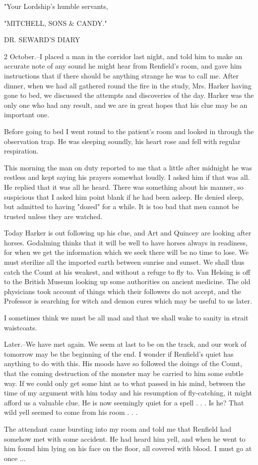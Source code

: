 "Your Lordship's humble servants, 

"MITCHELL, SONS & CANDY." 

DR. SEWARD'S DIARY 

2 October.--I placed a man in the corridor last night, and told him to make an accurate note of any sound he might hear from Renfield's room, and gave him instructions that if there should be anything strange he was to call me. After dinner, when we had all gathered round the fire in the study, Mrs. Harker having gone to bed, we discussed the attempts and discoveries of the day. Harker was the only one who had any result, and we are in great hopes that his clue may be an important one. 

Before going to bed I went round to the patient's room and looked in through the observation trap. He was sleeping soundly, his heart rose and fell with regular respiration. 

This morning the man on duty reported to me that a little after midnight he was restless and kept saying his prayers somewhat loudly. I asked him if that was all. He replied that it was all he heard. There was something about his manner, so suspicious that I asked him point blank if he had been asleep. He denied sleep, but admitted to having "dozed" for a while. It is too bad that men cannot be trusted unless they are watched. 

Today Harker is out following up his clue, and Art and Quincey are looking after horses. Godalming thinks that it will be well to have horses always in readiness, for when we get the information which we seek there will be no time to lose. We must sterilize all the imported earth between sunrise and sunset. We shall thus catch the Count at his weakest, and without a refuge to fly to. Van Helsing is off to the British Museum looking up some authorities on ancient medicine. The old physicians took account of things which their followers do not accept, and the Professor is searching for witch and demon cures which may be useful to us later. 

I sometimes think we must be all mad and that we shall wake to sanity in strait waistcoats. 

Later.--We have met again. We seem at last to be on the track, and our work of tomorrow may be the beginning of the end. I wonder if Renfield's quiet has anything to do with this. His moods have so followed the doings of the Count, that the coming destruction of the monster may be carried to him some subtle way. If we could only get some hint as to what passed in his mind, between the time of my argument with him today and his resumption of fly-catching, it might afford us a valuable clue. He is now seemingly quiet for a spell . . . Is he? That wild yell seemed to come from his room . . . 

The attendant came bursting into my room and told me that Renfield had somehow met with some accident. He had heard him yell, and when he went to him found him lying on his face on the floor, all covered with blood. I must go at once ... 
